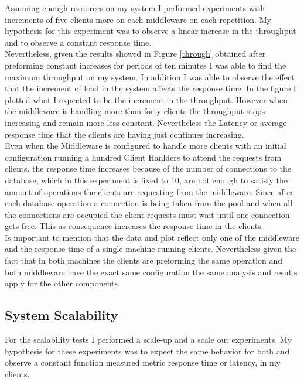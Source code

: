 Assuming enough resources on my system I performed experiments with increments of five clients more on each middleware on each repetition. My hypothesis for this experiment was to observe a linear increase in the throughput and to observe a constant response time.\\

Nevertheless, given the results showed in Figure \ref{through} obtained after preforming constant increases for periods of ten minutes I was able to find the maximum throughput on my system. In addition I was able to observe the effect that the increment of load in the system affects the response time. In the figure I plotted what I expected to be the increment in the throughput. However when the middleware is handling more than forty clients the throughput stops increasing and remain more less constant. Nevertheless the Latency or average response time that the clients are having just continues increasing.\\

Even when the Middleware is configured to handle more clients with an initial configuration running a hundred Client Hanlders to attend the requests from clients, the response time increases because of the number of connections to the database, which in this experiment is fixed to 10, are not enough to satisfy the amount of operations the clients are requesting from the middleware. Since after each database operation a connection is being taken from the pool and when all the connections are occupied the client requests must wait until one connection gets free. This as consequence increases the response time in the clients.\\

Is important to mention that the data and plot reflect only one of the middleware and the response time of a single machine running clients. Nevertheless given the fact that in both machines the clients are preforming the same operation and both middleware have the exact same configuration the same analysis and results apply for the other components.

\subsection{System Scalability}\label{sec:system-scalability}

For the scalability tests I performed a scale-up and a scale out experiments. My hypothesis for these experiments was to expect the same behavior for both and observe a constant function measured metric response time or latency, in my clients.\\

